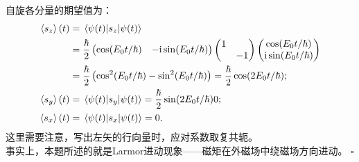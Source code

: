 \begin{tcolorbox}[breakable, title={\textbf{例题：Larmor进动}}]
    自旋各分量的期望值为：
    \begin{equation}
    \begin{aligned}
        \expval{s_z}(t) &= \mel{\psi(t)}{s_z}{\psi(t)} \\
        &= \frac{\hbar}{2} \begin{pmatrix} \cos(E_0 t/\hbar) & -\mathrm{i}\sin(E_0 t/\hbar) \end{pmatrix} \begin{pmatrix} 1 & \\ & -1 \end{pmatrix} \begin{pmatrix} \cos(E_0 t/\hbar) \\ \mathrm{i}\sin(E_0 t/\hbar) \end{pmatrix} \\
        &= \frac{\hbar}{2} \left(\cos^2(E_0 t/\hbar) - \sin^2(E_0 t/\hbar)\right)
        = \frac{\hbar}{2} \cos(2E_0 t/\hbar); \\
        \expval{s_y}(t) &= \mel{\psi(t)}{s_y}{\psi(t)} = \frac{\hbar}{2} \sin(2E_0 t/\hbar)0; \\
        \expval{s_x}(t) &= \mel{\psi(t)}{s_x}{\psi(t)} = 0.
    \end{aligned}
    \end{equation}
    这里需要注意，写出左矢的行向量时，应对系数取复共轭。\\
    事实上，本题所述的就是Larmor进动现象——磁矩在外磁场中绕磁场方向进动。
    \hfill $\square$
\end{tcolorbox}

